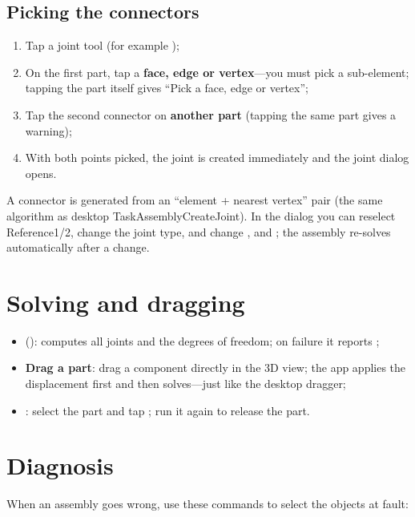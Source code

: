 \subsection{Picking the connectors}

\begin{enumerate}
  \item Tap a joint tool (for example );
  \item On the first part, tap a \textbf{face, edge or vertex}---you must pick a sub-element; tapping the
        part itself gives ``Pick a face, edge or vertex'';
  \item Tap the second connector on \textbf{another part} (tapping the same part gives a warning);
  \item With both points picked, the joint is created immediately and the joint dialog opens.
\end{enumerate}

A connector is generated from an ``element + nearest vertex'' pair (the same algorithm as desktop
TaskAssemblyCreateJoint). In the dialog you can reselect Reference1/2, change the joint type, and change
,  and ; the assembly re-solves automatically after a change.

\section{Solving and dragging}

\begin{itemize}
  \item {} (): computes all joints and the degrees of freedom;
        on failure it reports ;
  \item \textbf{Drag a part}: drag a component directly in the 3D view; the app applies the displacement
        first and then solves---just like the desktop dragger;
  \item {}: select the part and tap ; run it again to release the part.
\end{itemize}

\section{Diagnosis}

When an assembly goes wrong, use these commands to select the objects at fault:

